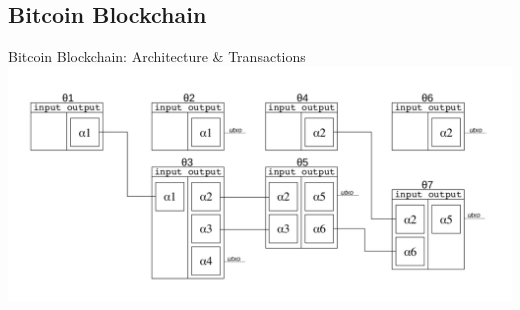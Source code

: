 \documentclass{beamer}
\begin{document}
\subsection{Bitcoin Blockchain}
\begin{frame}{Bitcoin Blockchain: Architecture \& Transactions}
    \centering
    \label{fig:ReteEsempio_1}
    \includegraphics[width=1\linewidth]{ReteEsempio_1}
\end{frame}
\end{document}
